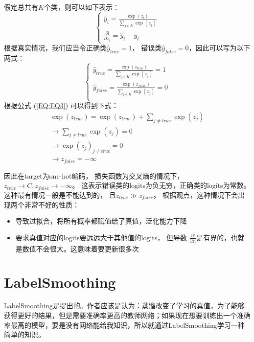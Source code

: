 \documentclass{article}
\begin{document}
假定总共有$K$个类，则可以如下表示：
\begin{equation}
    \begin{cases}
        \hat{y}_i = \frac{\exp (z_i)}{\sum_{j\in K} \exp(z_j)} \\
        \frac{\partial l}{\partial z_i} = \hat{y}_i - y_i
    \end{cases}
    \label{EQ:EQ1}
\end{equation}
根据真实情况，我们应当令正确类$\hat{y}_{true}=1$， 错误类$\hat{y}_{false}=0$，因此可以写为以下两式：
\begin{equation}
    \begin{cases}
        \hat{y}_{true} = \frac{\exp (z_{true})}{\sum_{j \in K} \exp (z_{j})} = 1\\
        \hat{y}_{false} = \frac{\exp (z_{false})}{\sum_{j \in K} \exp (z_{j})} = 0\\
    \end{cases}
    \label{EQ:EQ3}
\end{equation}
根据公式 (\ref{EQ:EQ3}) 可以得到下式：
\begin{equation}
    \begin{split}
        \exp(z_{true}) = \exp (z_{true}) + \sum_{j \neq true} \exp(z_j) \\
        \rightarrow \sum_{j \neq true} \exp(z_j) = 0 \\
        \rightarrow \exp (z_j)_{j \neq true} = 0 \\
        \rightarrow z_{false} = - \infty
    \end{split}
\end{equation}

\begin{tcolorbox}[title=Conclusion]
    因此在target为one-hot编码， 损失函数为交叉熵的情况下，$z_{true} \rightarrow C, z_{false} \rightarrow - \infty$。
    这表示错误类的logits为负无穷，正确类的logits为常数。这种最有情况一般是不能达到的， 且$z_{true} \gg z_{false}$。
    根据\cite{DBLP:conf/cvpr/SzegedyVISW16}观点，这种情况下会出现两个非常不好的性质：
    \begin{itemize}
        \item 导致过拟合，将所有概率都赋值给了真值，泛化能力下降
        \item 要求真值对应的logits要远远大于其他值的logits， 但导数 $\frac{\partial l}{\partial z_i}$是有界的，也就是数值不会很大。这意味着要更新很多次
    \end{itemize}
\end{tcolorbox}

\section{LabelSmoothing}
LabelSmoothing是\cite{DBLP:conf/cvpr/SzegedyVISW16}提出的。作者应该是认为：蒸馏改变了学习的真值，为了能够获得更好的结果，但是需要准确率更高的教师网络；如果现在想要训练出一个准确率最高的模型，要是没有网络能给我知识，所以就通过LabelSmoothing学习一种简单的知识。
\end{document}
